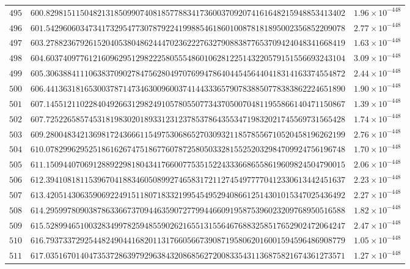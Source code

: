 \documentclass[12pt,reqno]{amsart}
\theoremstyle{remark}
\begin{document}
\begin{longtable}{clc}
$495$ & $600.8298151150482131850990740818577883417360037092074161648215948853413402$ & $1.96\times 10^{-448}$ \\
$496$ & $601.5429606034734173295477307879224199885461860100878181895002356852209078$ & $2.77\times 10^{-448}$ \\
$497$ & $603.2788236792615204053804862444702362227632790883877653709424048341668419$ & $1.63\times 10^{-448}$ \\
$498$ & $604.6037409776121609629512982225805554860106281225143220579151556693243104$ & $3.09\times 10^{-448}$ \\
$499$ & $605.3063884111063837090278475628049707699478640445456440418314163374554872$ & $2.44\times 10^{-448}$ \\
$500$ & $606.4413631816530037871473463009600374144333657907838850778383862224651890$ & $1.90\times 10^{-448}$ \\
$501$ & $607.1455121102284049266312982491057805507734370500704811955866140471150867$ & $1.39\times 10^{-448}$ \\
$502$ & $607.7252265857453181983020189331231237853786435534719832021745569731565428$ & $1.74\times 10^{-448}$ \\
$503$ & $609.2800483421369817243666115497530686527030932118578556710520458196262199$ & $2.76\times 10^{-448}$ \\
$504$ & $610.0782996295251861626747518677607872580503328155252032984709924756196748$ & $1.70\times 10^{-448}$ \\
$505$ & $611.1509440706912889229818043417660077535152243336686558619609824504790015$ & $2.06\times 10^{-448}$ \\
$506$ & $612.3941081811539670418834605089927465831721127454977770412330613442451637$ & $2.23\times 10^{-448}$ \\
$507$ & $613.4205143063590692249151180718332199545495294086612514301015347025436492$ & $2.27\times 10^{-448}$ \\
$508$ & $614.2959978090387863366737094463590727799446609195875396023209768950516588$ & $1.82\times 10^{-448}$ \\
$509$ & $615.5289946510032834997825948559026216551315564676883258517652902472064247$ & $2.47\times 10^{-448}$ \\
$510$ & $616.7937337292544824904416820113176605667390871958062016001594596486908779$ & $1.05\times 10^{-448}$ \\
$511$ & $617.0351670140473537286397929638432086856272008335431136875821674361273571$ & $1.27\times 10^{-448}$ \\

\end{longtable}
\end{document}
